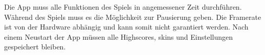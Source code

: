 Die App \gls{muss} alle Funktionen des Spiels in angemessener Zeit durchführen. 
Während des Spiels \gls{muss} es die Möglichkeit zur Pausierung geben.
Die Framerate ist von der Hardware abhängig und kann somit nicht garantiert werden.
Nach einem Neustart der App müssen alle Highscores, \glspl{skin} und Einstellungen gespeichert bleiben.